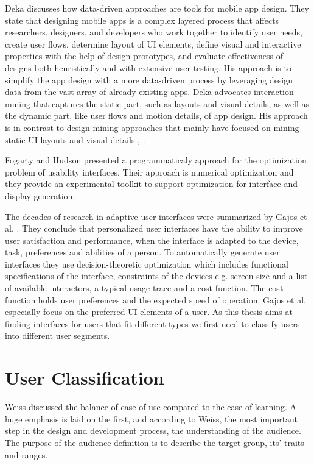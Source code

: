 Deka \cite{deka2016data} discusses how data-driven approaches are tools for mobile app design. They state that designing mobile apps is a complex layered process that affects researchers, designers, and developers who work together to identify user needs, create user flows, determine layout of UI elements, define visual and interactive properties with the help of design prototypes, and evaluate effectiveness of designs both heuristically and with extensive user testing. His approach is to simplify the app design with a more data-driven process by leveraging design data from the vast array of already existing apps. Deka advocates interaction mining that captures the static part, such as layouts and visual details, as well as the dynamic part, like user flows and motion details, of app design. His approach is in contrast to design mining approaches that mainly have focused on mining static UI layouts and visual details \cite{kumar2013webzeitgeist}, \cite{alharbi2015collect}.

Fogarty and Hudson \cite{fogarty2003gadget} presented a programmaticaly approach for the optimization problem of usability interfaces. Their approach is numerical optimization and they provide an experimental toolkit to support optimization for interface and display generation.

The decades of research in adaptive user interfaces were summarized by Gajos et al. \cite{gajos2008decision}. They conclude that personalized user interfaces have the ability to improve user satisfaction and performance, when the interface is adapted to the device, task, preferences and abilities of a person. To automatically generate user interfaces they use decision-theoretic optimization which includes functional specifications of the interface, constraints of the devices e.g. screen size and a list of available interactors, a typical usage trace and a cost function. The cost function holds user preferences and the expected speed of operation. Gajos et al. especially focus on the preferred UI elements of a user. As this thesis aims at finding interfaces for users that fit different types we first need to classify users into different user segments.

\section{User Classification}

Weiss \cite{weiss2003handheld} discussed the balance of ease of use compared to the ease of learning. A huge emphasis is laid on the first, and according to Weiss, the most important step in the design and development process, the understanding of the audience. The purpose of the audience definition is to describe the target group, its' traits and ranges.

